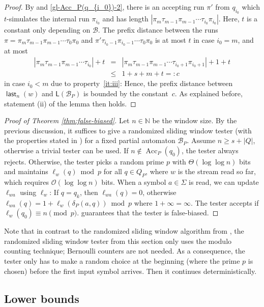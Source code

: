 \documentclass{theoretics}
\newcommand{\N}{\mathbb{N}}
\newcommand{\B}{\mathcal{B}}
\renewcommand{\O}{\mathcal{O}}
\renewcommand{\L}{\mathsf{L}}
\DeclareMathOperator{\last}{\mathsf{last}}
\DeclareMathOperator{\Acc}{Acc}
\renewcommand{\geq}{\geqslant}
\renewcommand{\leq}{\leqslant}
\renewcommand{\ge}{\geq}
\renewcommand{\le}{\leq}
\begin{document}
\begin{proof}
By  and \eqref{gl-Acc_P(q_{i_0})-2}, there is an accepting run $\pi'$ from $q_{i_0}$
which $t$-simulates the internal run $\pi_{i_0}$ and has length $|\pi_m \tau_{m-1} \pi_{m-1} \cdots \tau_{i_0} \pi_{i_0}|$.
Here, $t$ is a constant only depending on $\B$.
The prefix distance between the runs
$\pi = \pi_m \tau_{m-1} \pi_{m-1} \cdots \tau_0 \pi_0$ and
$\pi' \tau_{i_0-1} \pi_{{i_0}-1} \cdots \tau_0 \pi_0$ 
is at most $t$ in case $i_0 = m$, and at most
\begin{eqnarray*}
	|\pi_m \tau_{m-1} \pi_{m-1} \cdots \tau_{i_0}| + t &=& |\pi_m \tau_{m-1} \pi_{m-1} \cdots \tau_{{i_0}+1} \pi_{{i_0}+1}| + 1 + t \\
	& \le & 1 + s + m + t =: c
\end{eqnarray*}
in case $i_0 < m$ due to property~\ref{it:iii}:
Hence, the prefix distance between $\last_n(w)$ and $\L(\B_P)$ is bounded by the constant~$c$. As explained before, statement (ii)
of the lemma then holds.
\end{proof}

\begin{proof}[Proof of Theorem \ref{thm:false-biased}]
Let $n \in \N$ be the window size. By the previous discussion,
it suffices to give a randomized sliding window tester (with the properties stated in )
for a fixed partial automaton $\B_P$.
Assume $n \ge s + |Q|$, otherwise a trivial tester can be used.
If $n \notin \Acc_P(q_0)$, the tester always rejects. Otherwise, the tester picks a random prime $p$ with
$\Theta(\log \log n)$ bits and maintains $\ell_w(q) \bmod p$ for all $q \in Q_P$,
where $w$ is the stream read so far, which requires $\O(\log \log n)$ bits.
When a symbol $a \in \Sigma$ is read, we can update $\ell_{wa}$ using $\ell_w$: 
If $q = q_k$, then $\ell_{wa}(q) = 0$, otherwise $\ell_{wa}(q) = 1 + \ell_w(\delta_P(a,q)) \bmod p$
where $1 + \infty = \infty$. The tester accepts if $\ell_w(q_0) \equiv n \pmod p$. 
 guarantees that the tester is false-biased.
\end{proof}
Note that in contrast to the randomized sliding window algorithm from , the 
randomized sliding window tester from this section only uses the modulo counting technique; Bernoulli counters are not needed.
As a consequence, the tester only has to make a random choice at the beginning (where the prime $p$ is chosen) before the first input symbol arrives. Then it 
continues deterministically. 


\subsection{Lower bounds}
\end{document}
